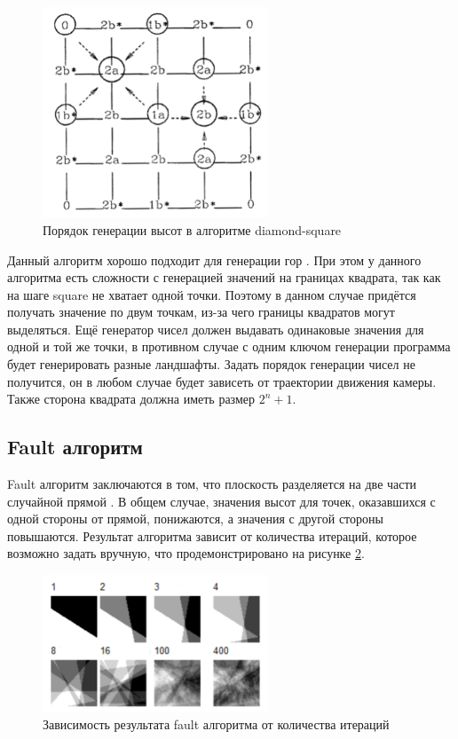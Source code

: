 \begin{figure}[h!]
	\centering
	\includegraphics[width=0.6\textwidth]{tex_parts/ds.png}
	\caption{\label{fig:ds}Порядок генерации высот в алгоритме diamond-square \cite{images}}
\end{figure}

 Данный алгоритм хорошо подходит для генерации гор \cite{landscapes}. При этом у данного алгоритма есть сложности с генерацией значений на границах квадрата, так как на шаге square не хватает одной точки. Поэтому в данном случае придётся получать значение по двум точкам, из-за чего границы квадратов могут выделяться. Ещё генератор чисел должен выдавать одинаковые значения для одной и той же точки, в противном случае с одним ключом генерации программа будет генерировать разные ландшафты. Задать порядок генерации чисел не получится, он в любом случае будет зависеть от траектории движения камеры. Также сторона квадрата должна иметь размер $2^n+1$.

\subsection{Fault алгоритм}

Fault  алгоритм  заключаются  в  том,  что  плоскость  разделяется  на  две  части случайной  прямой \cite{fault}.  В  общем  случае,  значения  высот  для  точек,  оказавшихся  с  одной стороны  от  прямой,  понижаются,  а  значения  с  другой стороны повышаются.  Результат алгоритма зависит от количества итераций, которое возможно задать вручную, что продемонстрировано на рисунке \ref{fig:fault}.

\begin{figure}[h!]
	\centering
	\includegraphics[width=0.6\textwidth]{tex_parts/fault.png}
	\caption{\label{fig:fault}Зависимость результата fault алгоритма от количества итераций \cite{images}}
\end{figure}

